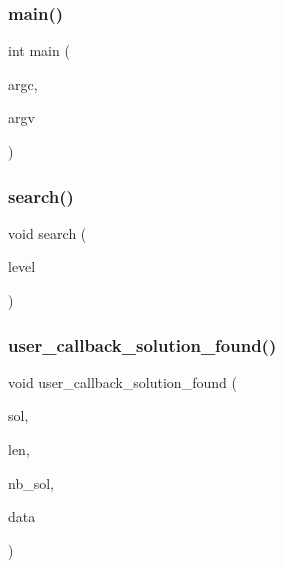 \subsubsection{\texorpdfstring{main()}{main()}}
{\footnotesize\ttfamily int main (\begin{DoxyParamCaption}\item[{int}]{argc,  }\item[{char $\ast$$\ast$}]{argv }\end{DoxyParamCaption})}

\mbox{\label{k__arc__lifting_8_c_a732ccfe2d9eb7b0def86d4f1af46bd1c}} 
\subsubsection{\texorpdfstring{search()}{search()}}
{\footnotesize\ttfamily void search (\begin{DoxyParamCaption}\item[{\mbox{\hyperlink{galois_8h_a09fddde158a3a20bd2dcadb609de11dc}{I\+NT}}}]{level }\end{DoxyParamCaption})}

\mbox{\label{k__arc__lifting_8_c_aae70f58c3ef18694815b8f53b6ecbe05}} 
\subsubsection{\texorpdfstring{user\+\_\+callback\+\_\+solution\+\_\+found()}{user\_callback\_solution\_found()}}
{\footnotesize\ttfamily void user\+\_\+callback\+\_\+solution\+\_\+found (\begin{DoxyParamCaption}\item[{\mbox{\hyperlink{galois_8h_a09fddde158a3a20bd2dcadb609de11dc}{I\+NT}} $\ast$}]{sol,  }\item[{\mbox{\hyperlink{galois_8h_a09fddde158a3a20bd2dcadb609de11dc}{I\+NT}}}]{len,  }\item[{\mbox{\hyperlink{galois_8h_a09fddde158a3a20bd2dcadb609de11dc}{I\+NT}}}]{nb\+\_\+sol,  }\item[{void $\ast$}]{data }\end{DoxyParamCaption})}



